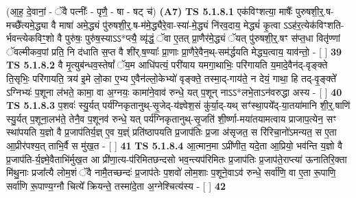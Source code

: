 \documentclass[17pt]{extarticle}
\begin{document}
                      (आ॒ह॒ दे॒वानां॒ - ॅवै पत्नीः᳚ - पृणै॒ - षा - षट् च॑)  \textbf{(A7)} \newline \newline
                                        \textbf{ TS 5.1.8.1} \newline
                  एक॑विꣳशत्या॒ माषैः᳚ पुरुषशी॒र्॒.ष-मच्छै᳚त्यमे॒द्ध्या वै माषा॑ अमे॒द्ध्यं पु॑रुषशी॒र्॒.ष-म॑मे॒द्ध्यैरे॒वा-स्या॑-मे॒द्ध्यं नि॑रव॒दाय॒ मेद्ध्यं॑ कृ॒त्वा ऽऽह॑र॒त्येक॑विꣳशति-र्भवन्त्येकविꣳ॒॒शो वै पुरु॑षः॒ पुरु॑ष॒स्याऽऽ*प्त्यै॒ व्यृ॑द्धं॒ ॅवा ए॒तत् प्रा॒णैर॑मे॒द्ध्यं ॅयत् पु॑रुषशी॒र्॒.षꣳ स॑प्त॒धा वितृ॑ण्णां ॅवल्मीकव॒पां प्रति॒ नि द॑धाति स॒प्त वै शी॑र्.ष॒ण्याः᳚ प्रा॒णाः प्रा॒णैरे॒वैन॒थ्-सम॑र्द्धयति मेद्ध्य॒त्वाय॒ याव॑न्तो॒ - [  ] \textbf{  39} \newline
                  \newline
                                \textbf{ TS 5.1.8.2} \newline
                  वै मृ॒त्युब॑न्धव॒स्तेषां᳚ ॅय॒म आधि॑पत्यं॒ परी॑याय यमगा॒थाभिः॒ परि॑गायति य॒मादे॒वैन॑द्-वृङ्क्ते ति॒सृभिः॒ परि॑गायति॒ त्रय॑ इ॒मे लो॒का ए॒भ्य ए॒वैन॑ल्लो॒केभ्यो॑ वृङ्क्ते॒ तस्मा॒द्-गाय॑ते॒ न देयं॒ गाथा॒ हि तद्-वृ॒ङ्क्ते᳚ ऽग्निभ्यः॑ प॒शूना ल॑भते॒ कामा॒ वा अ॒ग्नयः॒ कामा॑ने॒वाव॑ रुन्धे॒ यत् प॒शून् नाऽऽ*लभे॒ताऽन॑वरुद्धा अस्य - [  ] \textbf{  40} \newline
                  \newline
                                \textbf{ TS 5.1.8.3} \newline
                  प॒शवः॑ स्यु॒र्यत् पर्य॑ग्निकृतानुथ्-सृ॒जेद्-य॑ज्ञ्वेश॒सं कु॑र्या॒द्-यथ् सꣳ॑स्था॒पये᳚द्-या॒तया॑मानि शी॒र्॒.षाणि॑ स्यु॒र्यत् प॒शूना॒लभ॑ते॒ तेनै॒व प॒शूनव॑ रुन्धे॒ यत् पर्य॑ग्निकृतानुथ्-सृ॒जति॑ शी॒र्ष्णा-मया॑तयामत्वाय प्राजाप॒त्येन॒ सꣳ स्था॑पयति य॒ज्ञो वै प्र॒जाप॑तिर्य॒ज्ञ् ए॒व य॒ज्ञ्ं प्रति॑ष्ठापयति प्र॒जाप॑तिः प्र॒जा अ॑सृजत॒ स रि॑रिचा॒नो॑ऽमन्यत॒ स ए॒ता आ॒प्रीर॑पश्य॒त् ताभि॒र्वै स मु॑ख॒त - [  ] \textbf{  41} \newline
                  \newline
                                \textbf{ TS 5.1.8.4} \newline
                  आ॒त्मान॒मा ऽप्री॑णीत॒ यदे॒ता आ॒प्रियो॒ भव॑न्ति य॒ज्ञो वै प्र॒जाप॑ति-र्य॒ज्ञ्मे॒वैताभि॑र्मुख॒त आ प्री॑णा॒त्य-प॑रिमितछन्दसो भव॒न्त्यप॑रिमितः प्र॒जाप॑तिः प्र॒जाप॑ते॒राप्त्या॑ ऊनातिरि॒क्ता मि॑थु॒नाः प्रजा᳚त्यै लोम॒शं ॅवै नामै॒तच्छन्दः॑ प्र॒जाप॑तेः प॒शवो॑ लोम॒शाः प॒शूने॒वाऽव॑ रुन्धे॒ सर्वा॑णि॒ वा ए॒ता रू॒पाणि॒ सर्वा॑णि रू॒पाण्य॒ग्नौ चित्ये᳚ क्रियन्ते॒ तस्मा॑दे॒ता अ॒ग्नेश्चित्य॑स्य - [  ] \textbf{  42} \newline
\end{document}
